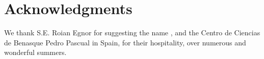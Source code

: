 \section{Acknowledgments}

We thank  S.E. Roian Egnor for suggesting the name \rscape, and the
Centro de Ciencias de Benasque Pedro Pascual in Spain, for their
hospitality, over numerous and wonderful summers.

\label{manualend}

